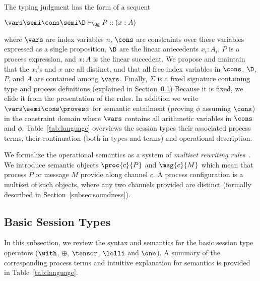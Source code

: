 The typing judgment has the form of a sequent
\begin{center}
  \begin{minipage}{0cm}
  \begin{tabbing}
  $\vars \semi \cons \semi \D \vdash_\Sg P :: (x : A)$
  \end{tabbing}
  \end{minipage}
\end{center}
where $\vars$ are index variables $n$, $\cons$ are constraints over
these variables expressed as a single proposition,
$\D$ are the linear antecedents $x_i : A_i$, $P$ is a process
expression, and $x : A$ is the linear succedent. We propose and maintain
that the $x_i$'s and $x$ are all distinct, and that all free index
variables in $\cons$, $\D$, $P$, and $A$ are contained among $\vars$.
Finally, $\Sigma$ is a fixed signature containing type and process
definitions (explained in Section~\ref{subsec:base}) Because it is
fixed, we elide it from the presentation of the rules.  In addition we
write $\vars \semi \cons \proves \phi$ for semantic entailment
(proving $\phi$ assuming $\cons$) in the
constraint domain where $\vars$ contains all arithmetic variables in
$\cons$ and $\phi$.
Table~\ref{tab:language} overviews the session types their associated
process terms, their continuation (both in types and terms) and operational description.

We formalize the operational semantics as a system of \emph{multiset rewriting
rules}~\cite{Cervesato09SEM}. We introduce semantic objects $\proc{c}{P}$
and $\msg{c}{M}$ which mean that process $P$ or message $M$ provide
along channel $c$.
A process configuration is a multiset of such objects, where any two
channels provided are distinct
(formally described in Section~\ref{subsec:soundness}).

\subsection{Basic Session Types}\label{subsec:base}
In this subsection, we review the syntax and semantics for the basic
session type operators ($\with$, $\oplus$, $\tensor$, $\lolli$ and $\one$).
A summary of the corresponding process terms and intuitive explanation
for semantics is provided in Table~\ref{tab:language}.

